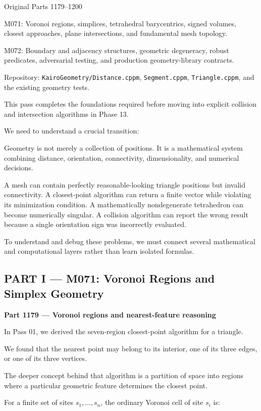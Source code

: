 Original Parts 1179--1200

M071: Voronoi regions, simplices, tetrahedral barycentrics, signed volumes, closest approaches, plane intersections, and fundamental mesh topology.

M072: Boundary and adjacency structures, geometric degeneracy, robust predicates, adversarial testing, and production geometry-library contracts.

Repository: \texttt{KairoGeometry/Distance.cppm}, \texttt{Segment.cppm}, \texttt{Triangle.cppm}, and the existing geometry tests.

This pass completes the foundations required before moving into explicit collision and intersection algorithms in Phase 13.

We need to understand a crucial transition:

Geometry is not merely a collection of positions. It is a mathematical system combining distance, orientation, connectivity, dimensionality, and numerical decisions.

A mesh can contain perfectly reasonable-looking triangle positions but invalid connectivity. A closest-point algorithm can return a finite vector while violating its minimization condition. A mathematically nondegenerate tetrahedron can become numerically singular. A collision algorithm can report the wrong result because a single orientation sign was incorrectly evaluated.

To understand and debug these problems, we must connect several mathematical and computational layers rather than learn isolated formulas.

\subsection{PART I --- M071: Voronoi Regions and Simplex Geometry}\label{04-visual-computing-ii-ch022-part-i-m071-voronoi-regions-and-simplex-geometry}

\textbf{Part 1179 --- Voronoi regions and nearest-feature reasoning}

In Pass 01, we derived the seven-region closest-point algorithm for a triangle.

We found that the nearest point may belong to its interior, one of its three edges, or one of its three vertices.

The deeper concept behind that algorithm is a partition of space into regions where a particular geometric feature determines the closest point.

For a finite set of sites \(s_1,\ldots,s_n\), the ordinary Voronoi cell of site \(s_i\) is:

